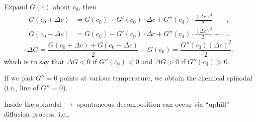 \documentclass[12pt]{article}
\makeatletter
\newcommand{\gettikzxy}[3]{%
  \tikz@scan@one@point\pgfutil@firstofone#1\relax
  \edef#2{\the\pgf@x}%
  \edef#3{\the\pgf@y}%
}
\makeatother
\begin{document}
Expand $G(c)$ about $c_0$, then
\begin{align*}
	G(c_0 + \Delta c) & =
	G(c_0) + G'(c_0) \cdot \Delta c +
	G''(c_0) \cdot \frac{ (\Delta c)^2 }{ 2! }
	+ \cdots,\\
	G(c_0 - \Delta c) & =
	G(c_0) - G'(c_0) \cdot \Delta c +
	G''(c_0) \cdot \frac{ (\Delta c)^2 }{ 2! }
	+ \cdots.
\end{align*}
\begin{equation*}
	\therefore \Delta G = \frac{ G(c_0 + \Delta c) + G(c_0 - \Delta c) }{ 2 }
	- G(c_0) = \frac{ G''(c_0) (\Delta c)^2 }{ 2 },
\end{equation*}
which is to say that $\Delta G < 0$ if $G''(c_0) < 0$ and $\Delta G > 0$ if
$G''(c_0) > 0$.

If we plot $G'' = 0$ points at various temperature, we obtain the chemical
spinodal (i.e., line of $G'' = 0$).

\begin{figure}[h]
  
\end{figure}

Inside the spinodal $\rightarrow$ spontaneous decomposition can occur
via ``uphill'' diffusion process, i.e.,

\begin{figure}[h]
	\centering
	\begin{minipage}[b]{.5\linewidth}
		\centering
		
	\end{minipage}%
	\hfill
	\begin{minipage}[b]{.5\linewidth}
		\centering
		
	\end{minipage}
\end{figure}
\end{document}
